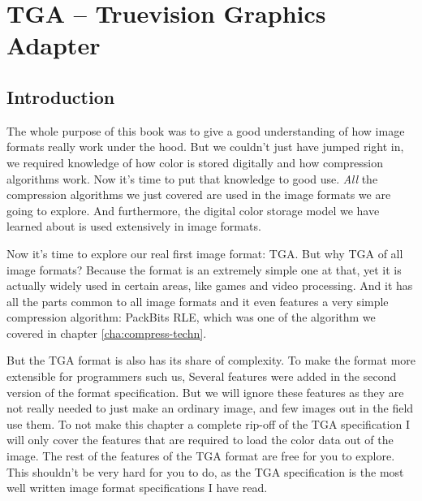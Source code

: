 \begin{comment}
  
\end{comment}

\chapter{TGA -- Truevision Graphics Adapter}
\label{cha:tga}

\begin{refsection}

  \section{Introduction}
  \label{sec:tga-introduction}

  The whole purpose of this book was to give a good understanding of
  how image formats really work under the hood. But we couldn't just
  have jumped right in, we required knowledge of how color is stored
  digitally and how compression algorithms work. Now it's time to put
  that knowledge to good use. \textit{All} the compression algorithms
  we just covered are used in the image formats we are going to
  explore. And furthermore, the digital color storage model we have
  learned about is used extensively in image formats.

  Now it's time to explore our real first image format:
  TGA. But why TGA of all image formats? Because the format
  is an extremely simple one at that, yet it is actually widely used
  in certain areas, like games and video processing. And it has all the
  parts common to all image formats and it even features a very simple
  compression algorithm: PackBits RLE, which was one of the algorithm we
  covered in chapter \ref{cha:compress-techn}.

  But the TGA format is also has its share of complexity. To make the
  format more extensible for programmers such us, Several features
  were added in the second version of the format specification. But we
  will ignore these features as they are not really needed to just
  make an ordinary image, and few images out in the field use them. To
  not make this chapter a complete rip-off of the TGA specification
  \cite{91:_truev_tga_file_format_specif} I will only cover the
  features that are required to load the color data out of the
  image. The rest of the features of the TGA format are free for you
  to explore. This shouldn't be very hard for you to do, as the TGA
  specification is the most well written image format specifications I
  have read.


\end{refsection}
